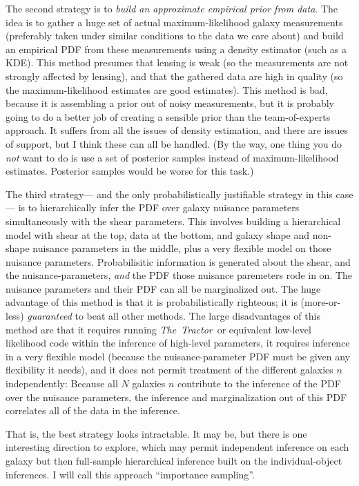 \documentclass[12pt]{article}
\newcommand{\project}[1]{\textsl{#1}}
\newcommand{\thetractor}{\project{The~Tractor}}
\begin{document}
The second strategy is to \emph{build an approximate empirical prior from data}.
The idea is to gather a huge set of actual maximum-likelihood galaxy measurements
  (preferably taken under similar conditions to the data we care about)
  and build an empirical PDF from these measurements using a density estimator
  (such as a KDE).
This method presumes that lensing is weak
  (so the measurements are not strongly affected by lensing),
  and that the gathered data are high in quality
  (so the maximum-likelihood estimates are good estimates).
This method is bad, because it is assembling a prior out of noisy measurements,
  but it is probably going to do a better job of creating a sensible prior
  than the team-of-experts approach.
It suffers from all the issues of density estimation,
  and there are issues of support,
  but I think these can all be handled.
(By the way, one thing you do \emph{not} want to do is use a set of posterior samples
  instead of maximum-likelihood estimates.
  Posterior samples would be worse for this task.)

The third strategy---%
  and the only probabilistically justifiable strategy in this case---%
  is to hierarchically infer the PDF over galaxy nuisance parameters
  simultaneously with the shear parameters.
This involves building a hierarchical model with shear at the top,
  data at the bottom,
  and galaxy shape and non-shape nuisance parameters in the middle,
  plus a very flexible model on those nuisance parameters.
Probabilisitic information is generated about the shear,
  and the nuisance-parameters,
  \emph{and} the PDF those nuisance paremeters rode in on.
The nuisance parameters and their PDF can all be marginalized out.
The huge advantage of this method is that it is probabilistically righteous;
  it is (more-or-less) \emph{guaranteed} to beat all other methods.
The large disadvantages of this method are that
  it requires running \thetractor\ or equivalent low-level likelihood code
  within the inference of high-level parameters,
  it requires inference in a very flexible model
  (because the nuisance-parameter PDF must be given any flexibility it needs),
  and it does not permit treatment of the different galaxies $n$ independently:
Because all $N$ galaxies $n$ contribute to the inference of the PDF over the nuisance parameters,
  the inference and marginalization out of this PDF correlates all of the data in the inference.

That is, the best strategy looks intractable.
It may be, but there is one interesting direction to explore,
  which may permit independent inference on each galaxy but then full-sample hierarchical inference
  built on the individual-object inferences.
I will call this approach ``importance sampling''.
\end{document}
